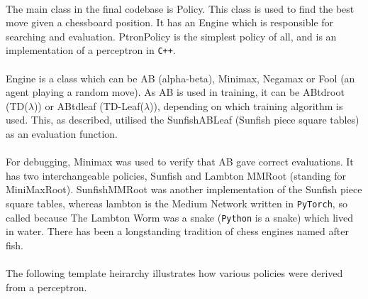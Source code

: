 \documentclass[12pt,a4paper]{book}
\begin{document}
\paragraph{} The main class in the final codebase is Policy. This class is used to find the best move given a chessboard position. It has an Engine which is responsible for searching and evaluation. PtronPolicy is the simplest policy of all, and is an implementation of a perceptron in \texttt{C++}.

\paragraph{} Engine is a class which can be AB (alpha-beta), Minimax, Negamax or Fool (an agent playing a random move). As AB is used in training, it can be ABtdroot (TD($\lambda$)) or ABtdleaf (TD-Leaf($\lambda$)), depending on which training algorithm is used. This, as described, utilised the SunfishABLeaf (Sunfish piece square tables) as an evaluation function.

\paragraph{} For debugging, Minimax was used to verify that AB gave correct evaluations. It has two interchangeable policies, Sunfish and Lambton MMRoot (standing for MiniMaxRoot). SunfishMMRoot was another implementation of the Sunfish piece square tables, whereas lambton is the Medium Network written in \texttt{PyTorch}, so called because The Lambton Worm was a snake (\texttt{Python} is a snake) which lived in water. There has been a longstanding tradition of chess engines named after fish.

\paragraph{} The following template heirarchy illustrates how various policies were derived from a perceptron.
\end{document}
